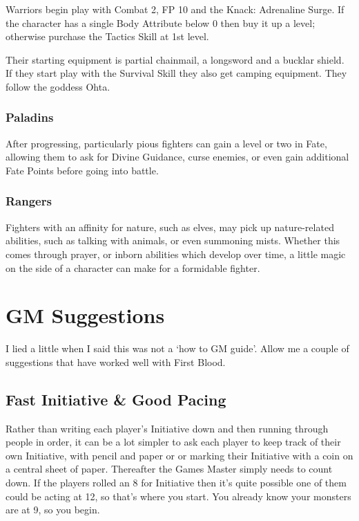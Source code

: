 Warriors begin play with Combat 2, FP 10 and the Knack: Adrenaline Surge.  If the character has a single Body Attribute below 0 then buy it up a level; otherwise purchase the Tactics Skill at 1st level.

Their starting equipment is partial chainmail, a longsword and a bucklar shield.  If they start play with the Survival Skill they also get camping equipment.  They follow the goddess Ohta.

\subsubsection{Paladins}

After progressing, particularly pious fighters can gain a level or two in Fate, allowing them to ask for Divine Guidance, curse enemies, or even gain additional Fate Points before going into battle.

\subsubsection{Rangers}

Fighters with an affinity for nature, such as elves, may pick up nature-related abilities, such as talking with animals, or even summoning mists.  Whether this comes through prayer, or inborn abilities which develop over time, a little magic on the side of a character can make for a formidable fighter.

\section{GM Suggestions}
I lied a little when I said this was not a `how to GM guide'.  Allow me a couple of suggestions that have worked well with First Blood.

\subsection{Fast Initiative \& Good Pacing}

Rather than writing each player's Initiative down and then running through people in order, it can be a lot simpler to ask each player to keep track of their own Initiative, with pencil and paper or or marking their Initiative with a coin on a central sheet of paper. Thereafter the Games Master simply needs to count down. If the players rolled an 8 for Initiative then it's quite possible one of them could be acting at 12, so that's where you start. You already know your monsters are at 9, so you begin.

